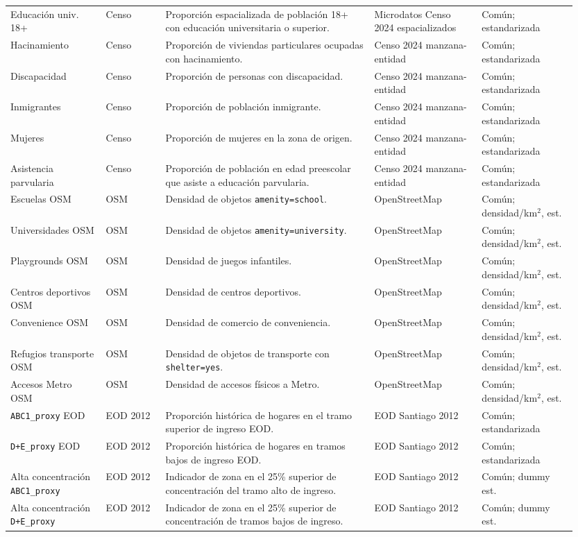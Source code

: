 \begin{landscape}
\begin{longtable}{p{0.16\linewidth} p{0.10\linewidth} p{0.35\linewidth} p{0.18\linewidth} p{0.16\linewidth}}
Educación univ. 18+ & Censo & Proporción espacializada de población 18+ con educación universitaria o superior. & Microdatos Censo 2024 espacializados & Común; estandarizada \\
Hacinamiento & Censo & Proporción de viviendas particulares ocupadas con hacinamiento. & Censo 2024 manzana-entidad & Común; estandarizada \\
Discapacidad & Censo & Proporción de personas con discapacidad. & Censo 2024 manzana-entidad & Común; estandarizada \\
Inmigrantes & Censo & Proporción de población inmigrante. & Censo 2024 manzana-entidad & Común; estandarizada \\
Mujeres & Censo & Proporción de mujeres en la zona de origen. & Censo 2024 manzana-entidad & Común; estandarizada \\
Asistencia parvularia & Censo & Proporción de población en edad preescolar que asiste a educación parvularia. & Censo 2024 manzana-entidad & Común; estandarizada \\

Escuelas OSM & OSM & Densidad de objetos \texttt{amenity=school}. & OpenStreetMap & Común; densidad/km\(^2\), est. \\
Universidades OSM & OSM & Densidad de objetos \texttt{amenity=university}. & OpenStreetMap & Común; densidad/km\(^2\), est. \\
Playgrounds OSM & OSM & Densidad de juegos infantiles. & OpenStreetMap & Común; densidad/km\(^2\), est. \\
Centros deportivos OSM & OSM & Densidad de centros deportivos. & OpenStreetMap & Común; densidad/km\(^2\), est. \\
Convenience OSM & OSM & Densidad de comercio de conveniencia. & OpenStreetMap & Común; densidad/km\(^2\), est. \\
Refugios transporte OSM & OSM & Densidad de objetos de transporte con \texttt{shelter=yes}. & OpenStreetMap & Común; densidad/km\(^2\), est. \\
Accesos Metro OSM & OSM & Densidad de accesos físicos a Metro. & OpenStreetMap & Común; densidad/km\(^2\), est. \\

\texttt{ABC1\_proxy} EOD & EOD 2012 & Proporción histórica de hogares en el tramo superior de ingreso EOD. & EOD Santiago 2012 & Común; estandarizada \\
\texttt{D+E\_proxy} EOD & EOD 2012 & Proporción histórica de hogares en tramos bajos de ingreso EOD. & EOD Santiago 2012 & Común; estandarizada \\
Alta concentración \texttt{ABC1\_proxy} & EOD 2012 & Indicador de zona en el 25\% superior de concentración del tramo alto de ingreso. & EOD Santiago 2012 & Común; dummy est. \\
Alta concentración \texttt{D+E\_proxy} & EOD 2012 & Indicador de zona en el 25\% superior de concentración de tramos bajos de ingreso. & EOD Santiago 2012 & Común; dummy est. \\


\end{longtable}
\end{landscape}
